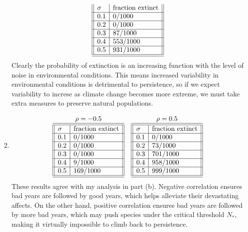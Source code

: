 \documentclass{article} %
\theoremstyle{plain}
\numberwithin{equation}{section} %
\numberwithin{figure}{section} %
\numberwithin{table}{section} %
\begin{document}
\begin{enumerate}[\ \ (a)]
\begin{align}
\begin{array}{||l|l||}
                \sigma & \text{fraction extinct} \\\hline
                0.1 & 0/1000 \\\hline
                0.2 & 0/1000 \\\hline
                0.3 & 87/1000 \\\hline
                0.4 & 553/1000 \\\hline
                0.5 & 931/1000 \\\hline\hline
            \end{array}
        \end{align}
        Clearly the probability of extinction is an increasing function with the level of noise in environmental conditions.  This means increased variability in environmental conditions is detrimental to persistence, so if we expect variability to increse as climate change becomes more extreme, we must take extra measures to preserve natural populations.
    \item
        \begin{align}
            \begin{array}{cc}
                \rho = -0.5 & \rho = 0.5 \\
                \begin{array}{||l|l||}\hline\hline
                    \sigma & \text{fraction extinct} \\\hline
                    0.1 & 0/1000 \\\hline
                    0.2 & 0/1000 \\\hline
                    0.3 & 0/1000 \\\hline
                    0.4 & 9/1000 \\\hline
                    0.5 & 169/1000 \\\hline\hline
                \end{array} & \begin{array}{||l|l||}\hline\hline
                    \sigma & \text{fraction extinct} \\\hline
                    0.1 & 0/1000 \\\hline
                    0.2 & 73/1000 \\\hline
                    0.3 & 701/1000 \\\hline
                    0.4 & 958/1000 \\\hline
                    0.5 & 999/1000 \\\hline\hline
                \end{array}
            \end{array}
        \end{align}
        These results agree with my analysis in part (b).  Negative correlation ensures bad years are followed by good years, which helps alleviate their devastating affects.  On the other hand, positive correlation ensures bad years are followed by more bad years, which may push species under the critical threshold $N_*$, making it virtually impossible to climb back to persistence.
\end{enumerate}
\end{document}

